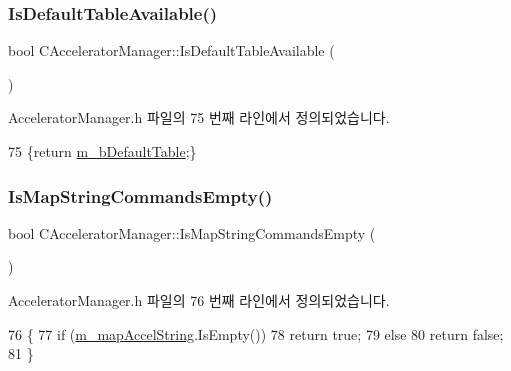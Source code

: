 \subsubsection{\texorpdfstring{Is\+Default\+Table\+Available()}{IsDefaultTableAvailable()}}
{\footnotesize\ttfamily bool C\+Accelerator\+Manager\+::\+Is\+Default\+Table\+Available (\begin{DoxyParamCaption}{ }\end{DoxyParamCaption})\hspace{0.3cm}{\ttfamily [inline]}}



Accelerator\+Manager.\+h 파일의 75 번째 라인에서 정의되었습니다.


\begin{DoxyCode}
75 \{\textcolor{keywordflow}{return} \mbox{\hyperlink{class_c_accelerator_manager_ac563baf2a7cedb91bc44e9b8581a6020}{m\_bDefaultTable}};\}
\end{DoxyCode}
\mbox{\label{class_c_accelerator_manager_a6773f028b9c0b04c9a7b6d02c1a96be0}} 
\subsubsection{\texorpdfstring{Is\+Map\+String\+Commands\+Empty()}{IsMapStringCommandsEmpty()}}
{\footnotesize\ttfamily bool C\+Accelerator\+Manager\+::\+Is\+Map\+String\+Commands\+Empty (\begin{DoxyParamCaption}{ }\end{DoxyParamCaption})\hspace{0.3cm}{\ttfamily [inline]}}



Accelerator\+Manager.\+h 파일의 76 번째 라인에서 정의되었습니다.


\begin{DoxyCode}
76                                   \{
77     \textcolor{keywordflow}{if} (\mbox{\hyperlink{class_c_accelerator_manager_abb40dbb1a44c47ac22590e8f1243835b}{m\_mapAccelString}}.IsEmpty())
78       \textcolor{keywordflow}{return} \textcolor{keyword}{true};
79     \textcolor{keywordflow}{else}
80       \textcolor{keywordflow}{return} \textcolor{keyword}{false};
81   \}
\end{DoxyCode}
\mbox{\label{class_c_accelerator_manager_a8e87ae6f5464a4fa052c91c0ee361b6d}} 
